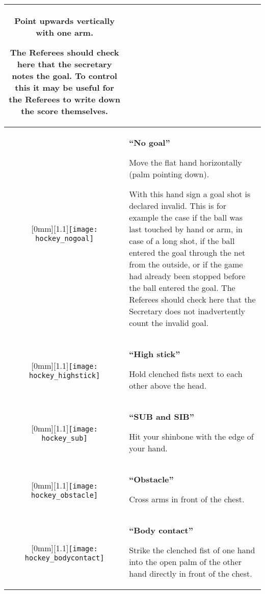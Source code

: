 \begin{longtable}{|c|p{10.8cm}|}
Point upwards vertically with one arm.

The Referees should check here that the secretary notes the goal.
To control this it may be useful for the Referees to write down the score themselves.\\ 

\hline %

\raisebox{-\height}[0mm][1.1\height]{\texttt{[image: hockey\_nogoal]}}
&
\textbf{``No goal''}

Move the flat hand horizontally (palm pointing down).

With this hand sign a goal shot is declared invalid.
This is for example the case if the ball was last touched by hand or arm, in case of a long shot, if the ball entered the goal through the net from the outside, or if the game had already been stopped before the ball entered the goal.
The Referees should check here that the Secretary does not inadvertently count the invalid goal.\\ 

\hline %

\raisebox{-\height}[0mm][1.1\height]{\texttt{[image: hockey\_highstick]}}
&
\textbf{``High stick''}

Hold clenched fists next to each other above the head.\\ 

\hline %

\raisebox{-\height}[0mm][1.1\height]{\texttt{[image: hockey\_sub]}}
  &
\textbf{``SUB and SIB''}

Hit your shinbone with the edge of your hand.\\

\hline %

\raisebox{-\height}[0mm][1.1\height]{\texttt{[image: hockey\_obstacle]}}
  &
\textbf{``Obstacle''}

Cross arms in front of the chest.\\

\hline %

\raisebox{-\height}[0mm][1.1\height]{\texttt{[image: hockey\_bodycontact]}}
  &
\textbf{``Body contact''}

Strike the clenched fist of one hand into the open palm of the other hand directly in front of the chest.\\


\end{longtable}
